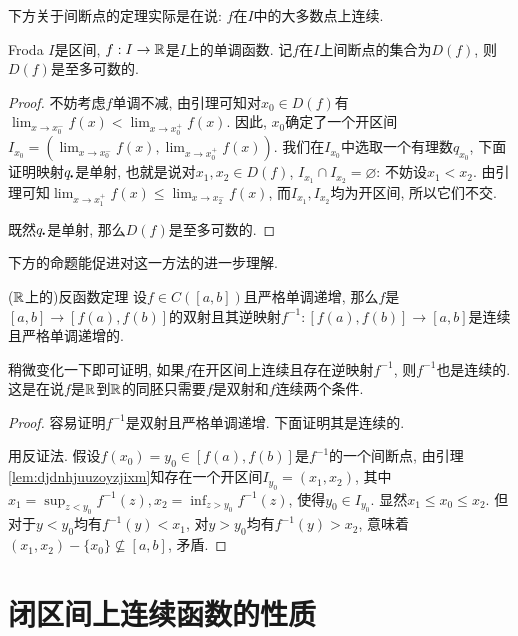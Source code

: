 下方关于间断点的定理实际是在说: $f$在$I$中的大多数点上连续. 

\begin{theorem}{Froda}
	$I$是区间, $f:I \to \mathbb{R}$是$I$上的单调函数. 记$f$在$I$上间断点的集合为$D(f)$, 则$D(f)$是至多可数的. 
\end{theorem}
\begin{proof}
	不妨考虑$f$单调不减, 由引理可知对$x_0 \in D(f)$有$\lim_{x \to x_0^-} f(x) < \lim_{x \to x_0^+} f(x)$. 因此, $x_0$确定了一个开区间$I_{x_0}=(\lim_{x \to x_0^-} f(x) , \lim_{x \to x_0^+} f(x))$. 我们在$I_{x_0}$中选取一个有理数$q_{x_0}$, 下面证明映射$q_{\bigcdot}$是单射, 也就是说对$x_1,x_2 \in D(f)$, $I_{x_1} \cap I_{x_2} = \varnothing$: 不妨设$x_1<x_2$. 由引理可知$\lim_{x \to x_1^+} f(x) \leq \lim_{x \to x_2^-} f(x)$, 而$I_{x_1},I_{x_2}$均为开区间, 所以它们不交. 
	
	既然$q_{\bigcdot}$是单射, 那么$D(f)$是至多可数的. 
\end{proof}

下方的命题能促进对这一方法的进一步理解. 

\begin{proposition}{($\mathbb{R}$上的)反函数定理}
	设$f \in C([a,b])$且严格单调递增, 那么$f$是$[a,b] \to [f(a),f(b)]$的双射且其逆映射$f^{-1}:[f(a),f(b)] \to [a,b]$是连续且严格单调递增的. 
\end{proposition}
\begin{remark}
	稍微变化一下即可证明, 如果$f$在开区间上连续且存在逆映射$f^{-1}$, 则$f^{-1}$也是连续的. 这是在说$f$是$\mathbb{R}$到$\mathbb{R}$的同胚只需要$f$是双射和$f$连续两个条件. 
\end{remark}
\begin{proof}
	容易证明$f^{-1}$是双射且严格单调递增. 下面证明其是连续的. 
	
	用反证法. 假设$f(x_0)=y_0 \in [f(a),f(b)]$是$f^{-1}$的一个间断点, 由引理\ref{lem:djdnhjuuzoyzjixm}知存在一个开区间$I_{y_0}=(x_1,x_2)$, 其中$x_1=\sup_{z<y_0}f^{-1}(z),x_2=\inf_{z>y_0}f^{-1}(z)$, 使得$y_0 \in I_{y_0}$. 显然$x_1 \leq x_0 \leq x_2$. 但对于$y<y_0$均有$f^{-1}(y)<x_1$, 对$y>y_0$均有$f^{-1}(y)>x_2$, 意味着$(x_1,x_2)-\{ x_0 \} \nsubseteq [a,b]$, 矛盾. 
\end{proof}





\newpage
\section{闭区间上连续函数的性质}

